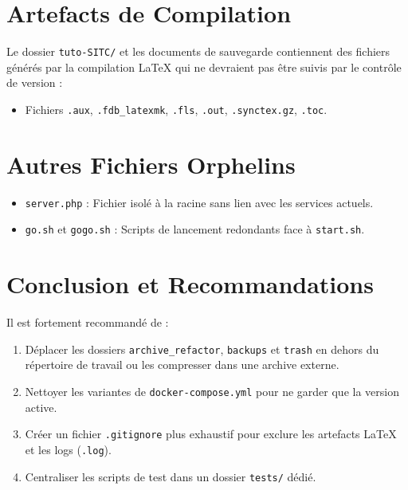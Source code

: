 \documentclass[a4paper,12pt]{article}
\begin{document}
\section{Artefacts de Compilation}
Le dossier \texttt{tuto-SITC/} et les documents de sauvegarde contiennent des fichiers générés par la compilation \LaTeX{} qui ne devraient pas être suivis par le contrôle de version :
\begin{itemize}
    \item Fichiers \texttt{.aux}, \texttt{.fdb\_latexmk}, \texttt{.fls}, \texttt{.out}, \texttt{.synctex.gz}, \texttt{.toc}.
\end{itemize}

\section{Autres Fichiers Orphelins}
\begin{itemize}
    \item \texttt{server.php} : Fichier isolé à la racine sans lien avec les services actuels.
    \item \texttt{go.sh} et \texttt{gogo.sh} : Scripts de lancement redondants face à \texttt{start.sh}.
\end{itemize}

\section{Conclusion et Recommandations}
Il est fortement recommandé de :
\begin{enumerate}
    \item Déplacer les dossiers \texttt{archive\_refactor}, \texttt{backups} et \texttt{trash} en dehors du répertoire de travail ou les compresser dans une archive externe.
    \item Nettoyer les variantes de \texttt{docker-compose.yml} pour ne garder que la version active.
    \item Créer un fichier \texttt{.gitignore} plus exhaustif pour exclure les artefacts \LaTeX{} et les logs (\texttt{.log}).
    \item Centraliser les scripts de test dans un dossier \texttt{tests/} dédié.
\end{enumerate}
\end{document}
